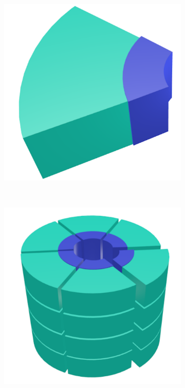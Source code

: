 \documentclass[journal=jpcbfk,manuscript=article]{achemso}
\begin{document}
\begin{figure}
\begin{subfigure}{0.3\linewidth}
		\includegraphics[width=\textwidth]{wedge_thick.pdf}
		\caption{}~\label{fig:wedge}
	\end{subfigure}
		\begin{subfigure}{0.4\linewidth}
		\centering
		\includegraphics[width=\textwidth]{columns.pdf}

\end{subfigure}
\end{figure}
\end{document}

